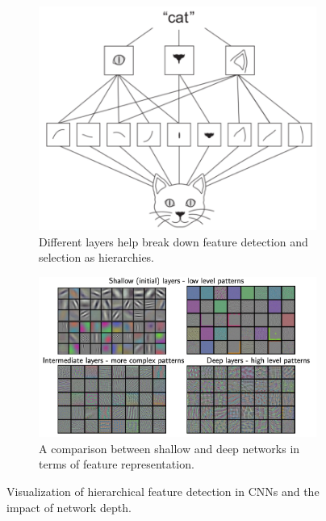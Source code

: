 \begin{itemize}
\begin{figure}[H]
    \centering
    \begin{subfigure}[b]{0.45\linewidth}
        \includegraphics[width=\linewidth]{img/hierarchical_cat.png}
        \caption{Different layers help break down feature detection and selection as hierarchies.}
    \end{subfigure}
    \hfill %
    \begin{subfigure}[b]{0.45\linewidth}
        \includegraphics[width=\linewidth]{img/shallow_deep.png}
        \caption{A comparison between shallow and deep networks in terms of feature representation.}
    \end{subfigure}
    \caption{Visualization of hierarchical feature detection in CNNs and the impact of network depth.}
\end{figure}

\end{itemize}

